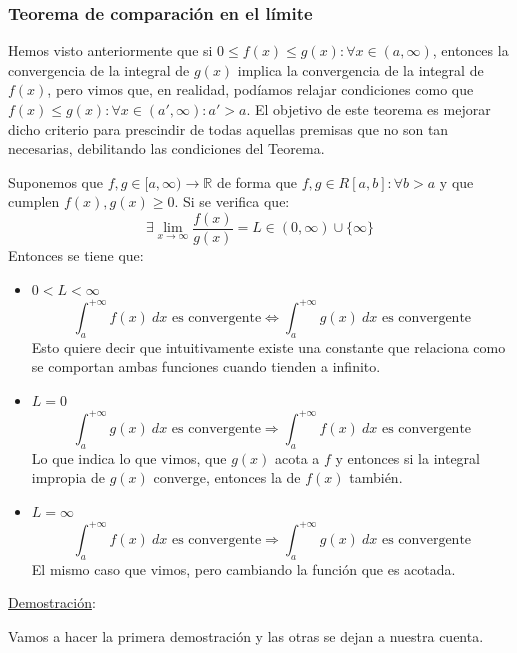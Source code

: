 \documentclass[10pt,a4paper,openright]{book}
\begin{document}
\subsubsection*{Teorema de comparación en el límite}
Hemos visto anteriormente que si $0\leq f(x)\leq g(x):\forall x \in (a,\infty)$, entonces la convergencia de la integral de $g(x)$ implica la convergencia de la integral de $f(x)$, pero vimos que, en realidad, podíamos relajar condiciones como que $f(x)\leq g(x): \forall x\in (a',\infty) : a' > a$. El objetivo de este teorema es mejorar dicho criterio para prescindir de todas aquellas premisas que no son tan necesarias, debilitando las condiciones del Teorema.

Suponemos que $f,g\in [a,\infty)\rightarrow \mathbb R$ de forma que $f,g\in R[a,b]:\forall b > a$ y que cumplen $f(x),g(x)\geq 0$. Si se verifica que:
$$\exists \lim_{x \rightarrow \infty} \frac{f(x)}{g(x)} = L \in (0, \infty)\cup \{\infty\}$$
Entonces se tiene que:
\begin{itemize}
\item $0< L < \infty$
$$\int_{a}^{+\infty} f(x) \ dx \mbox{ es convergente}\Leftrightarrow \int_{a}^{+\infty} g(x) \ dx \mbox{ es convergente}$$
Esto quiere decir que intuitivamente existe una constante que relaciona como se comportan ambas funciones cuando tienden a infinito.
\item $L=0$
$$\int_{a}^{+\infty} g(x)\ dx\mbox{ es convergente}\Rightarrow \int_{a}^{+\infty} f(x)\ dx\mbox{ es convergente}$$
Lo que indica lo que vimos, que $g(x)$ acota a $f$ y entonces si la integral impropia de $g(x)$ converge, entonces la de $f(x)$ también.
\item $L=\infty$
$$\int_{a}^{+\infty} f(x)\ dx\mbox{ es convergente}\Rightarrow \int_{a}^{+\infty} g(x)\ dx\mbox{ es convergente}$$
El mismo caso que vimos, pero cambiando la función que es acotada.
\end{itemize}

\underline{Demostración}:

Vamos a hacer la primera demostración y las otras se dejan a nuestra cuenta.
\end{document}
